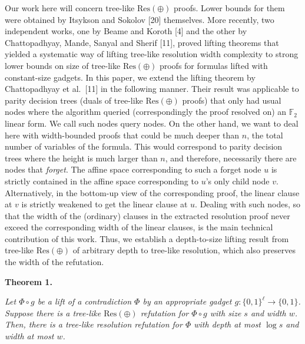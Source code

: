 Our work here will concern tree-like $\text{Res}(\oplus)$ proofs. Lower bounds for them were obtained by Itsykson and Sokolov [20] themselves. More recently, two independent works, one by Beame and Koroth [4] and the other by Chattopadhyay, Mande, Sanyal and Sherif [11], proved lifting theorems that yielded a systematic way of lifting tree-like resolution width complexity to strong lower bounds on size of tree-like $\text{Res}(\oplus)$ proofs for formulas lifted with constant-size gadgets.
In this paper, we extend the lifting theorem by Chattopadhyay et al. [11] in the following manner. Their result was applicable to parity decision trees (duals of tree-like $\text{Res}(\oplus)$ proofs) that only had usual nodes where the algorithm queried (correspondingly the proof resolved on) an $\mathbb{F}_{2}$ linear form. We call such nodes query nodes. On the other hand, we want to deal here with width-bounded proofs that could be much deeper than $n$, the total number of variables of the formula. This would correspond to parity decision trees where the height is much larger than $n$, and therefore, necessarily there are nodes that \emph{forget}. The affine space corresponding to such a forget node $u$ is strictly contained in the affine space corresponding to $u$’s only child node $v$. Alternatively, in the bottom-up view of the corresponding proof, the linear clause at $v$ is strictly weakened to get the linear clause at $u$. Dealing with such nodes, so that the width of the (ordinary) clauses in the extracted resolution proof never exceed the corresponding width of the linear clauses, is the main technical contribution of this work.
Thus, we establish a depth-to-size lifting result from tree-like $\text{Res}(\oplus)$ of arbitrary depth to tree-like resolution, which also preserves the width of the refutation.\par





\par\medskip\noindent\textbf{
\textbf{Theorem 1}\textbf{.}
}\par



\emph{Let $\Phi\circ g$ be a lift of a contradiction $\Phi$ by an appropriate gadget $g:\{0,1\}^{\ell}\to\{0,1\}$.
Suppose there is a tree-like $\text{Res}(\oplus)$ refutation for $\Phi\circ g$ with size $s$ and width $w$.
Then, there is a tree-like resolution refutation for $\Phi$ with depth at most $\log s$ and width at most $w$.}\par



